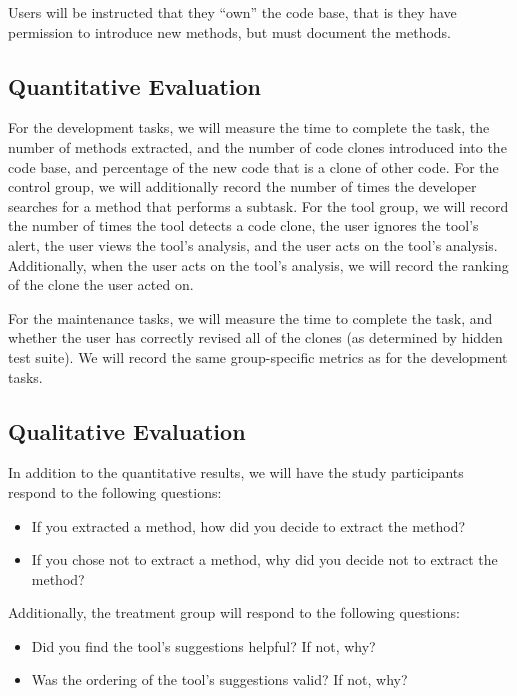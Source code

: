 \documentclass[preprint,10pt]{sigplanconf}
\begin{document}
Users will be instructed that they ``own'' the code base, that is they
have permission to introduce new methods, but must document the
methods.

\subsection{Quantitative Evaluation}
For the development tasks, we will measure the time to complete the
task, the number of methods extracted, and the number of code clones
introduced into the code base, and percentage of the new code that is
a clone of other code. For the control group, we will additionally
record the number of times the developer searches for a method that
performs a subtask. For the tool group, we will record the number of
times the tool detects a code clone, the user ignores the tool's
alert, the user views the tool's analysis, and the user acts on the
tool's analysis. Additionally, when the user acts on the tool's
analysis, we will record the ranking of the clone the user acted on.

For the maintenance tasks, we will measure the time to complete the
task, and whether the user has correctly revised all of the clones (as
determined by hidden test suite). We will record the same
group-specific metrics as for the development tasks.

\subsection{Qualitative Evaluation}
In addition to the quantitative results, we will have the study
participants respond to the following questions:

\begin{itemize}
  \item If you extracted a method, how did you decide to extract the
    method? 
  \item If you chose not to extract a method, why did you decide not
    to extract the method?
\end{itemize}

\noindent Additionally, the treatment group will respond to the following
questions:

\begin{itemize}
  \item Did you find the tool's suggestions helpful? If not, why?
  \item Was the ordering of the tool's suggestions valid? If not, why?
\end{itemize}
\end{document}
